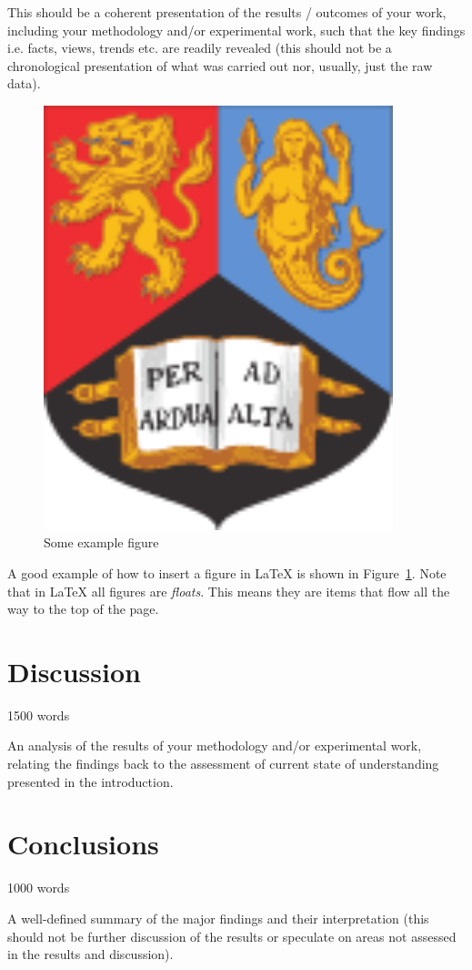 \documentclass[12pt, a4paper]{article}
\newcommand{\figref}[1]{Figure~\ref{#1}}
\begin{document}
This should be a coherent presentation of the results / outcomes of your work, including your methodology and/or experimental work, such that the key findings i.e. facts, views, trends etc. are readily revealed (this should not be a chronological presentation of what was carried out nor, usually, just the raw data).

\begin{figure}
\begin{center}
\includegraphics[width=4in]{figures/bham_crest.pdf}
\caption{Some example figure}
\label{examplefig}
\end{center}
\end{figure}

A good example of how to insert a figure in \LaTeX{} is shown in \figref{examplefig}. Note that in \LaTeX{} all figures are \emph{floats}. This means they are items that flow all the way to the top of the page.








\section{Discussion}
1500 words

An analysis of the results of your methodology and/or experimental work, relating the findings back to the assessment of current state of understanding presented in the introduction.






\section{Conclusions}
1000 words

A well-defined summary of the major findings and their interpretation (this should not be further discussion of the results or speculate on areas not assessed in the results and discussion).






 
\end{document}
